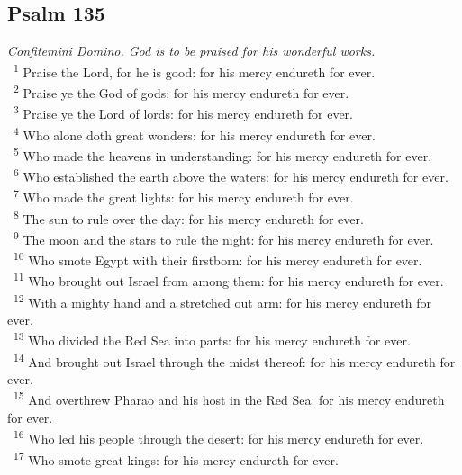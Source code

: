 \documentclass[a5paper,12pt]{article}
\begin{document}
\begin{multicols*}{2}
\section{Psalm 135}
\label{sec:orgb183c39}
\emph{Confitemini Domino. God is to be praised for his wonderful works.}\\

~\textsuperscript{1} Praise the Lord, for he is good: for his mercy endureth for ever.\\
~\textsuperscript{2} Praise ye the God of gods: for his mercy endureth for ever.\\
~\textsuperscript{3} Praise ye the Lord of lords: for his mercy endureth for ever.\\
~\textsuperscript{4} Who alone doth great wonders: for his mercy endureth for ever.\\
~\textsuperscript{5} Who made the heavens in understanding: for his mercy endureth for ever.\\
~\textsuperscript{6} Who established the earth above the waters: for his mercy endureth for ever.\\
~\textsuperscript{7} Who made the great lights: for his mercy endureth for ever.\\
~\textsuperscript{8} The sun to rule over the day: for his mercy endureth for ever.\\
~\textsuperscript{9} The moon and the stars to rule the night: for his mercy endureth for ever.\\
~\textsuperscript{10} Who smote Egypt with their firstborn: for his mercy endureth for ever.\\
~\textsuperscript{11} Who brought out Israel from among them: for his mercy endureth for ever.\\
~\textsuperscript{12} With a mighty hand and a stretched out arm: for his mercy endureth for ever.\\
~\textsuperscript{13} Who divided the Red Sea into parts: for his mercy endureth for ever.\\
~\textsuperscript{14} And brought out Israel through the midst thereof: for his mercy endureth for ever.\\
~\textsuperscript{15} And overthrew Pharao and his host in the Red Sea: for his mercy endureth for ever.\\
~\textsuperscript{16} Who led his people through the desert: for his mercy endureth for ever.\\
~\textsuperscript{17} Who smote great kings: for his mercy endureth for ever.\\

\end{multicols*}
\end{document}

